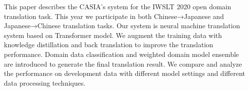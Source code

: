 This paper describes the CASIA's system for the IWSLT 2020 open domain translation task. This year we participate in both Chinese→Japanese and Japanese→Chinese translation tasks. Our system is neural machine translation system based on Transformer model. We augment the training data with knowledge distillation and back translation to improve the translation performance. Domain data classification and weighted domain model ensemble are introduced to generate the final translation result. We compare and analyze the performance on development data with different model settings and different data processing techniques.

